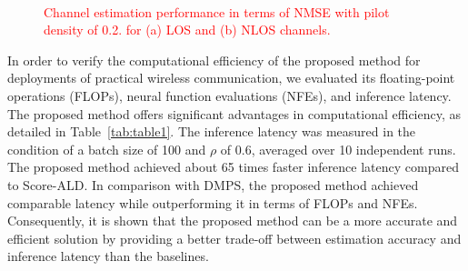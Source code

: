 \documentclass[lettersize,journal]{IEEEtran}
\newcommand{\tred}{\textcolor{red}}
\begin{document}
\begin{figure}[!t]
\\
\caption{\tred{Channel estimation performance in terms of NMSE with pilot density of 0.2. for (a) LOS and (b) NLOS channels.}}
\label{fig_sim_2}
\end{figure}

In order to verify the computational efficiency of the proposed method for deployments of practical wireless communication, we evaluated its floating-point operations (FLOPs), neural function evaluations (NFEs), and inference latency. The proposed method offers significant advantages in computational efficiency, as detailed in Table~\ref{tab:table1}. The inference latency was measured in the condition of a batch size of 100 and $\rho$ of 0.6, averaged over 10 independent runs. The proposed method achieved about 65 times faster inference latency compared to Score-ALD. In comparison with DMPS, the proposed method achieved comparable latency while outperforming it in terms of FLOPs and NFEs. Consequently, it is shown that the proposed method can be a more accurate and efficient solution by providing a better trade-off between estimation accuracy and inference latency than the baselines.
\end{document}
